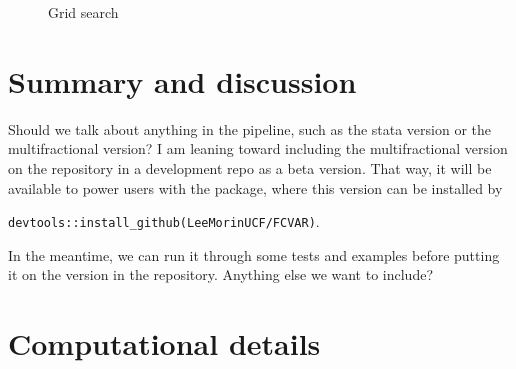\documentclass[article]{jss}
\begin{document}
\begin{figure}[H]
{  } 
  \caption{Grid search}
  \label{fig:LikeGrid}
\end{figure}






\section{Summary and discussion} \label{sec:summary}

\begin{leftbar}
Should we talk about anything in the pipeline, such as the stata version or the multifractional version?
I am leaning toward including the multifractional version on the repository in a development repo as a beta version. That way, it will be available to power users with the  package, where this version can be installed by 

\verb|devtools::install_github(LeeMorinUCF/FCVAR)|. 

In the meantime, we can run it through some tests and examples before putting it on the version in the repository. 
Anything else we want to include?
\end{leftbar}


\section*{Computational details}
\end{document}
